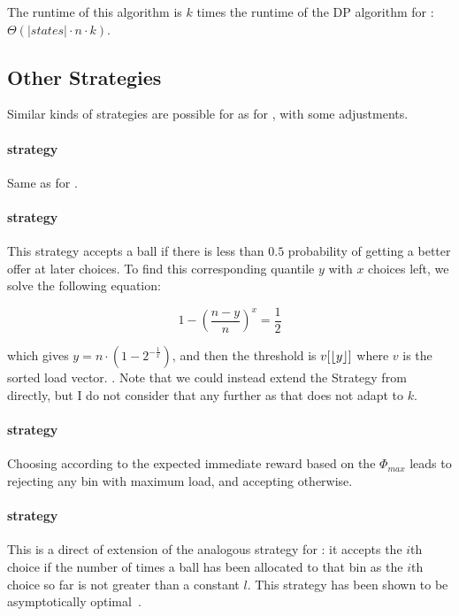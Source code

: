 
The runtime of this algorithm is $k$ times the runtime of the DP algorithm for \TwoThinning: $\Theta(|states|\cdot n\cdot k)$.


\subsection{Other Strategies}

Similar kinds of strategies are possible for \KThinning as for \TwoThinning, with some adjustments.

\paragraph{\AlwaysAccept strategy} Same as for \TwoThinning.


\paragraph{\Quantile strategy} This strategy accepts a ball if there is less than $0.5$ probability of getting a better offer at later choices. To find this corresponding quantile $y$ with $x$ choices left, we solve the following equation:

\begin{equation} \label{quantilekthinning}
1 - (\frac{n-y}{n})^x = \frac{1}{2}
\end{equation}

which gives $y = n \cdot  (1 - 2^{-\frac{1}{x}})$, and then the threshold is $v[\lfloor y\rfloor]$ where $v$ is the sorted load vector. . Note that we could instead extend the \MeanThinning Strategy from \TwoThinning directly, but I do not consider that any further as that does not adapt to $k$.


\paragraph{\LocalRewardOptimiser strategy} Choosing according to the expected immediate reward based on the $\Phi_{max}$ leads to rejecting any bin with maximum load, and accepting otherwise.


\paragraph{\Threshold strategy} This is a direct of extension of the analogous strategy for \TwoThinning: it accepts the $i$th choice if the number of times a ball has been allocated to that bin as the $i$th choice so far is not greater than a constant $l$. This strategy has been shown to be asymptotically optimal~\cite{feldheim2020dthinning}.


